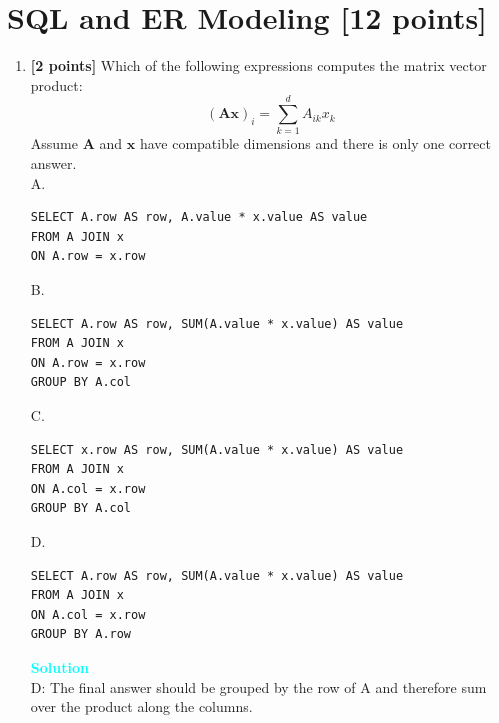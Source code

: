 \documentclass[10pt]{article}
\newenvironment{solution}
    { \begin{mdframed}[backgroundcolor=gray!10] \textcolor{cyan}{\textbf{Solution}} \\}
    {  \end{mdframed}}
\begin{document}
\section{SQL and ER Modeling \textbf{[12 points]}}
\begin{enumerate}

	\item \textbf{[2 points]}
	      Which of the following expressions computes the matrix vector product:
	      $$
		      (\mathbf{A} \mathbf{x})_{i}=\sum_{k=1}^{d} A_{i k} x_{k}
	      $$
	      Assume $\mathbf{A}$ and $\mathbf{x}$ have compatible dimensions and there is only one correct answer.\\
	      A.
	      \begin{lstlisting}
SELECT A.row AS row, A.value * x.value AS value 
FROM A JOIN x
ON A.row = x.row
\end{lstlisting}
	      B.
	      \begin{lstlisting}
SELECT A.row AS row, SUM(A.value * x.value) AS value 
FROM A JOIN x
ON A.row = x.row
GROUP BY A.col
\end{lstlisting}
	      C.
	      \begin{lstlisting} 
SELECT x.row AS row, SUM(A.value * x.value) AS value 
FROM A JOIN x
ON A.col = x.row
GROUP BY A.col
\end{lstlisting}
	      D.
	      \begin{lstlisting} 
SELECT A.row AS row, SUM(A.value * x.value) AS value 
FROM A JOIN x
ON A.col = x.row
GROUP BY A.row
\end{lstlisting}
	      \begin{solution}
		      D: The final answer should be grouped by the row of A and therefore sum over the product along the columns.
	      \end{solution}




\end{enumerate}
\end{document}
